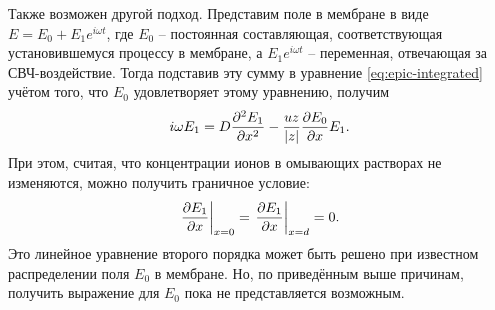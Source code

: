     Также возможен другой подход. Представим поле в мембране в виде
    \( E = E_0 + E_1e^{i\omega t} \), где \( E_0 \) -- постоянная составляющая,
    соответствующая установившемуся процессу в мембране, а \( E_1e^{i\omega t} \)
    -- переменная, отвечающая за СВЧ-воздействие. Тогда подставив эту сумму в
    уравнение \eqref{eq:epic-integrated} учётом того, что \( E_0 \)
    удовлетворяет этому уравнению, получим
    \[
        i\omega E_1 = D\frac{\partial^2 E_1}{\partial {x}^2} - \frac{uz}{\left| z \right|}\frac{\partial E_0}{\partial x}E_1.
    \]
    При этом, считая, что концентрации
    ионов в омывающих растворах не изменяются, можно получить граничное условие:
    \[
        \left.\frac{\partial E_1}{\partial x}\right|_{x=0} = \left.\frac{\partial E_1}{\partial x}\right|_{x=d} = 0.
    \]
    Это линейное уравнение второго порядка может быть решено при известном
    распределении поля \( E_0 \) в мембране. Но, по приведённым выше причинам,
    получить выражение для \( E_0 \) пока не представляется возможным.
